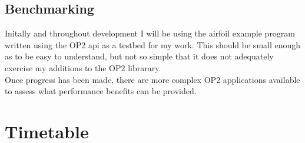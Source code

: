 \documentclass[11pt]{article}
\begin{document}
\subsection*{Benchmarking}
Initally and throughout development I will be using the airfoil\cite{airfoil} example program written using the OP2 api as a testbed for my work. This should be small enough as to be easy to understand, but not so simple that it does not adequately exercise my additions to the OP2 librarary.\\
Once progress has been made, there are more complex OP2 applications available to assess what performance benefits can be provided.

\section*{Timetable}
\end{document}
